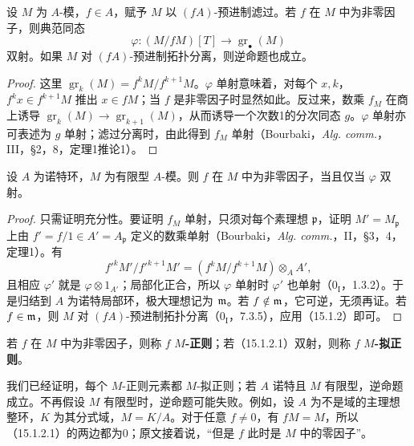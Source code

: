 设 $M$ 为 $A$-模，$f\in A$，赋予 $M$ 以 $(fA)$-预进制滤过。若 $f$ 在 $M$ 中为非零因子，则典范同态
\begin{equation}
 \varphi:(M/fM)[T]\longrightarrow\operatorname{gr}_\bullet(M)\tag{15.1.2.1}
\end{equation}
双射。如果 $M$ 对 $(fA)$-预进制拓扑分离，则逆命题也成立。
\begin{proof}
这里 $\operatorname{gr}_k(M)=f^kM/f^{k+1}M$。$\varphi$ 单射意味着，对每个 $x,k$，$f^kx\in f^{k+1}M$ 推出 $x\in fM$；当 $f$ 是非零因子时显然如此。反过来，数乘 $f_M$ 在商上诱导 $\operatorname{gr}_k(M)\to\operatorname{gr}_{k+1}(M)$，从而诱导一个次数1的分次同态 $g$。$\varphi$ 单射亦可表述为 $g$ 单射；滤过分离时，由此得到 $f_M$ 单射（Bourbaki，\textit{Alg. comm.}，III，§2，8，定理1推论1）。
\end{proof}

设 $A$ 为诺特环，$M$ 为有限型 $A$-模。则 $f$ 在 $M$ 中为非零因子，当且仅当 $\varphi$ 双射。
\begin{proof}
只需证明充分性。要证明 $f_M$ 单射，只须对每个素理想 $\mathfrak p$，证明 $M'=M_\mathfrak p$ 上由 $f'=f/1\in A'=A_\mathfrak p$ 定义的数乘单射（Bourbaki，\textit{Alg. comm.}，II，§3，4，定理1）。有
\[
 f'^kM'/f'^{k+1}M'=(f^kM/f^{k+1}M)\otimes_AA',
\]
且相应 $\varphi'$ 就是 $\varphi\otimes1_{A'}$；局部化正合，所以 $\varphi$ 单射时 $\varphi'$ 也单射（$0_{\mathrm I}$，1.3.2）。于是归结到 $A$ 为诺特局部环，极大理想记为 $\mathfrak m$。若 $f\notin\mathfrak m$，它可逆，无须再证。若 $f\in\mathfrak m$，则 $M$ 对 $(fA)$-预进制拓扑分离（$0_{\mathrm I}$，7.3.5），应用（15.1.2）即可。
\end{proof}

若 $f$ 在 $M$ 中为非零因子，则称 $f$ \textbf{$M$-正则}；若（15.1.2.1）双射，则称 $f$ \textbf{$M$-拟正则}。

我们已经证明，每个 $M$-正则元素都 $M$-拟正则；若 $A$ 诺特且 $M$ 有限型，逆命题成立。不再假设 $M$ 有限型时，逆命题可能失败。例如，设 $A$ 为不是域的主理想整环，$K$ 为其分式域，$M=K/A$。对于任意 $f\ne0$，有 $fM=M$，所以（15.1.2.1）的两边都为0；原文接着说，“但是 $f$ 此时是 $M$ 中的零因子”。
